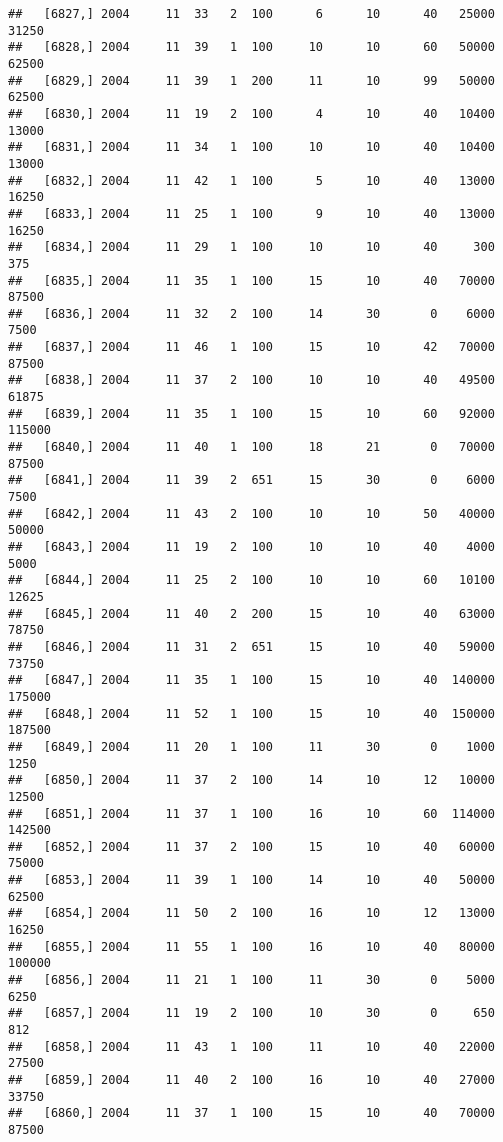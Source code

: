 \documentclass{article}\usepackage[]{graphicx}\usepackage[]{color}
\makeatletter
\newenvironment{kframe}{%
 \def\at@end@of@kframe{}%
 \ifinner\ifhmode%
  \def\at@end@of@kframe{\end{minipage}}%
  \begin{minipage}{\columnwidth}%
 \fi\fi%
 \def\FrameCommand##1{\hskip\@totalleftmargin \hskip-\fboxsep
 \colorbox{shadecolor}{##1}\hskip-\fboxsep
     \hskip-\linewidth \hskip-\@totalleftmargin \hskip\columnwidth}%
 \MakeFramed {\advance\hsize-\width
   \@totalleftmargin\z@ \linewidth\hsize
   \@setminipage}}%
 {\par\unskip\endMakeFramed%
 \at@end@of@kframe}
\newenvironment{knitrout}{}{} %
\makeatother
\begin{document}
\begin{knitrout}
\begin{kframe}
\begin{verbatim}
##   [6827,] 2004     11  33   2  100      6      10      40   25000   31250
##   [6828,] 2004     11  39   1  100     10      10      60   50000   62500
##   [6829,] 2004     11  39   1  200     11      10      99   50000   62500
##   [6830,] 2004     11  19   2  100      4      10      40   10400   13000
##   [6831,] 2004     11  34   1  100     10      10      40   10400   13000
##   [6832,] 2004     11  42   1  100      5      10      40   13000   16250
##   [6833,] 2004     11  25   1  100      9      10      40   13000   16250
##   [6834,] 2004     11  29   1  100     10      10      40     300     375
##   [6835,] 2004     11  35   1  100     15      10      40   70000   87500
##   [6836,] 2004     11  32   2  100     14      30       0    6000    7500
##   [6837,] 2004     11  46   1  100     15      10      42   70000   87500
##   [6838,] 2004     11  37   2  100     10      10      40   49500   61875
##   [6839,] 2004     11  35   1  100     15      10      60   92000  115000
##   [6840,] 2004     11  40   1  100     18      21       0   70000   87500
##   [6841,] 2004     11  39   2  651     15      30       0    6000    7500
##   [6842,] 2004     11  43   2  100     10      10      50   40000   50000
##   [6843,] 2004     11  19   2  100     10      10      40    4000    5000
##   [6844,] 2004     11  25   2  100     10      10      60   10100   12625
##   [6845,] 2004     11  40   2  200     15      10      40   63000   78750
##   [6846,] 2004     11  31   2  651     15      10      40   59000   73750
##   [6847,] 2004     11  35   1  100     15      10      40  140000  175000
##   [6848,] 2004     11  52   1  100     15      10      40  150000  187500
##   [6849,] 2004     11  20   1  100     11      30       0    1000    1250
##   [6850,] 2004     11  37   2  100     14      10      12   10000   12500
##   [6851,] 2004     11  37   1  100     16      10      60  114000  142500
##   [6852,] 2004     11  37   2  100     15      10      40   60000   75000
##   [6853,] 2004     11  39   1  100     14      10      40   50000   62500
##   [6854,] 2004     11  50   2  100     16      10      12   13000   16250
##   [6855,] 2004     11  55   1  100     16      10      40   80000  100000
##   [6856,] 2004     11  21   1  100     11      30       0    5000    6250
##   [6857,] 2004     11  19   2  100     10      30       0     650     812
##   [6858,] 2004     11  43   1  100     11      10      40   22000   27500
##   [6859,] 2004     11  40   2  100     16      10      40   27000   33750
##   [6860,] 2004     11  37   1  100     15      10      40   70000   87500

\end{verbatim}
\end{kframe}
\end{knitrout}
\end{document}
